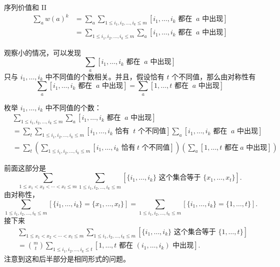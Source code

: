 \begin{frame}{序列价值和 II}
    $$
    \begin{aligned}
    \sum_{a}w(a)^k&=\sum_a\sum_{1\le i_1,i_2,\ldots,i_k\le m}[i_1,\ldots,i_k\text{ 都在 }\ a\text{ 中出现}]\\
    &=\sum_{1\le i_1,i_2,\ldots,i_k\le m}\sum_a[i_1,\ldots,i_k\text{ 都在 }\ a\text{ 中出现}]
    \end{aligned}
    $$

    观察小的情况，可以发现
    $$
    \sum_a[i_1,\ldots,i_k\text{ 都在 }\ a\text{ 中出现}]
    $$
    只与 $i_1,\ldots,i_k$ 中不同值的个数相关。并且，假设恰有 $t$ 个不同值，那么由对称性有
    $$
    \sum_a[i_1,\ldots,i_k\text{ 都在 }\ a\text{ 中出现}]=\sum_a[1,\ldots,t\text{ 都在 }\ a\text{ 中出现}]
    $$
\end{frame}
\begin{frame}
    枚举 $i_1,\ldots,i_k$ 中不同值的个数：
    $$
    \begin{aligned}
        &\sum_{1\le i_1,i_2,\ldots,i_k\le m}\sum_a[i_1,\ldots,i_k\text{ 都在 }\ a\text{ 中出现}]\\
        &=\sum_t\sum_{1\le i_1,i_2,\ldots,i_k\le m}[i_1,\ldots,i_k\text{ 恰有 }\ t\text{ 个不同值}]\sum_a[i_1,\ldots,i_k\text{ 都在 }\ a\text{ 中出现}]\\
        &=\sum_t\left(\sum_{1\le i_1,i_2,\ldots,i_k\le m}[i_1,\ldots,i_k\text{ 恰有}\ t\text{ 个不同值}]\right)\left(\sum_a[1,\ldots,t\text{ 都在}\ a\text{ 中出现}]\right)
        \end{aligned}
    $$
\end{frame}
\begin{frame}
    前面这部分是
    $$
    \sum_{1\le x_1<x_2<\cdots<x_t\le m}\sum_{1\le i_1,i_2,\ldots,i_k\le m}[\{i_1,\ldots,i_k\}\text{ 这个集合等于 }\{x_1,\ldots,x_t\}].
    $$
    由对称性，
    $$
    \sum_{1\le i_1,i_2,\ldots,i_k\le m}[\{i_1,\ldots,i_k\}=\{x_1,\ldots,x_t\}]=\sum_{1\le i_1,i_2,\ldots,i_k\le m}[\{i_1,\ldots,i_k\}=\{1,\ldots,t\}].
    $$
    接下来
    $$
    \begin{aligned}
    &\sum_{1\le x_1<x_2<\cdots<x_t\le m}\sum_{1\le i_1,i_2,\ldots,i_k\le m}[\{i_1,\ldots,i_k\}\text{ 这个集合等于 }\{1,\ldots,t\}]\\
    &=\binom{m}{t}\sum_{1\le i_1,i_2,\ldots,i_k\le t}[1,\ldots,t\text{ 都在 }(i_1,\ldots,i_k)\text{ 中出现}].
    \end{aligned}
    $$
    注意到这和后半部分是相同形式的问题。
\end{frame}
